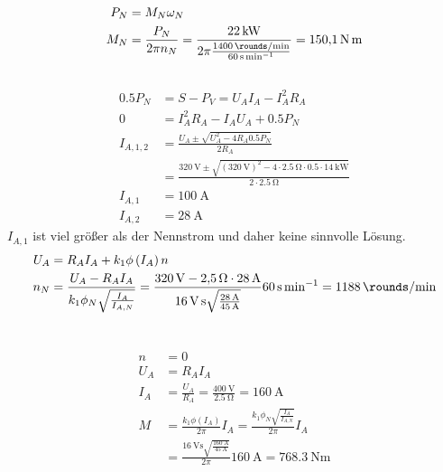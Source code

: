 \documentclass[11pt,a4paper]{scrartcl}
\newcommand{\mybr}[1]{\left(#1\right)}
\newcommand{\0}{_{\mybr{0}}}
\newcommand{\1}{_{\mybr{1}}}
\newcommand{\2}{_{\mybr{2}}}
\begin{document}
\subsection{}
\begin{align}
P_N&=M_N \omega_N\\
M_N&=\frac{P_N}{2\pi n_N}=\frac{\SI{22}{\kilo\watt}}{2\pi\frac{\SI{1400}{\rounds\per\minute}}{\SI{60}{\second\per\minute}}}=\SI{150.1}{\newton\metre}
\end{align}

\subsection{}
\begin{align}
\num{0.5}P_N&=S-P_V=U_A I_A - I_A^2 R_A\\
0&=I_A^2 R_A - I_A U_A + \num{0.5}P_N\\
I_{A,1,2}&=\frac{U_A\pm\sqrt{U_A^2-4 R_A \num{0.5}P_N}}{2 R_A}\\
&=\frac{\SI{320}{\volt}\pm\sqrt{\mybr{\SI{320}{\volt}}^2-4 \cdot \SI{2.5}{\ohm}\cdot \num{0.5}\cdot\SI{14}{\kilo\watt}}}{2 \cdot \SI{2.5}{\ohm}}\\
I_{A,1}&=\SI{100}{\ampere}\\
I_{A,2}&=\SI{28}{\ampere}
\end{align}
$I_{A,1}$ ist viel größer als der Nennstrom und daher keine sinnvolle Lösung.
\begin{align}
U_A&=R_A I_A + k_1\phi\mybr{I_A} n\\
n_N&=\frac{U_A-R_A I_A}{k_1\phi_N\sqrt{\frac{I_A}{I_{A,N}}}}=\frac{\SI{320}{\volt}-\SI{2.5}{\ohm}\cdot\SI{28}{\ampere}}{\SI{16}{\volt\second}\sqrt{\frac{\SI{28}{\ampere}}{\SI{45}{\ampere}}}}\SI{60}{\second\per\minute}=\SI{1188}{\rounds\per\minute}
\end{align}

\section{}
\subsection{}
\begin{align}
n&=0\\
U_A&=R_A I_A\\
I_A&=\frac{U_A}{R_A}=\frac{\SI{400}{\volt}}{\SI{2.5}{\ohm}}=\SI{160}{\ampere}\\
M&=\frac{k_1\phi\mybr{I_A}}{2\pi}I_A=\frac{k_1\phi_N\sqrt{\frac{I_A}{I_{A,N}}}}{2\pi}I_A\\
&=\frac{\SI{16}{\volt\second}\sqrt{\frac{\SI{160}{\ampere}}{\SI{45}{\ampere}}}}{2\pi}\SI{160}{\ampere}=\SI{768.3}{\newton\metre}
\end{align}
\end{document}
